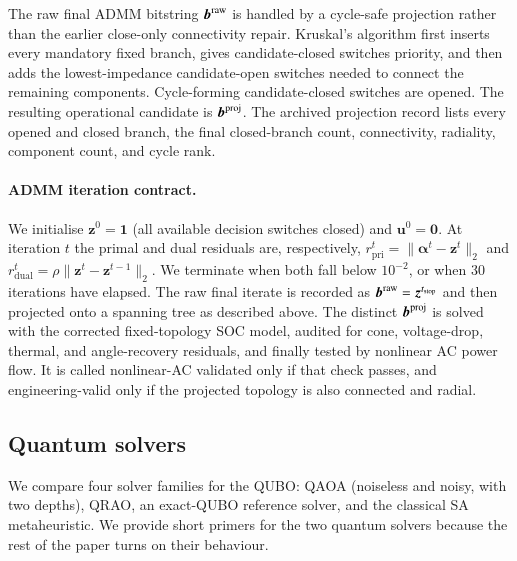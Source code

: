\documentclass[5p,twocolumn,number,sort&compress,nopreprintline]{elsarticle}
\begin{document}
The raw final ADMM bitstring $\boldsymbol b^{\rm raw}$ is handled by a
cycle-safe projection rather
than the earlier close-only connectivity repair. Kruskal's algorithm
first inserts every mandatory fixed branch, gives candidate-closed
switches priority, and then adds the lowest-impedance candidate-open
switches needed to connect the remaining components. Cycle-forming
candidate-closed switches are opened. The resulting operational
candidate is $\boldsymbol b^{\rm proj}$. The archived projection record lists
every opened and closed branch, the final closed-branch count,
connectivity, radiality, component count, and cycle rank.

\paragraph{ADMM iteration contract.}
We initialise $\boldsymbol z^0=\mathbf 1$ (all available decision
switches closed) and $\boldsymbol u^0=\boldsymbol 0$. At iteration $t$
the primal and dual residuals are, respectively,
$r_{\mathrm{pri}}^{t}=\|\boldsymbol\alpha^t-\boldsymbol z^t\|_2$ and
$r_{\mathrm{dual}}^{t}=\rho\|\boldsymbol z^t-
\boldsymbol z^{t-1}\|_2$. We terminate when both
fall below $10^{-2}$, or when 30 iterations have elapsed. The
raw final iterate is recorded as
$\boldsymbol b^{\rm raw}=\boldsymbol z^{t_{\rm stop}}$ and then projected
onto a spanning tree as described above. The distinct
$\boldsymbol b^{\rm proj}$ is solved with the corrected fixed-topology
SOC model, audited for cone, voltage-drop, thermal, and angle-recovery
residuals, and finally tested by nonlinear AC power flow. It is called
nonlinear-AC validated only if that check passes, and engineering-valid
only if the projected topology is also connected and radial.

\subsection{Quantum solvers}
\label{sec:quantum-solvers}
We compare four solver families for the QUBO: QAOA (noiseless and
noisy, with two depths), QRAO, an exact-QUBO reference solver, and the classical
SA metaheuristic. We provide short primers for the two quantum
solvers because the rest of the paper turns on their behaviour.
\end{document}
